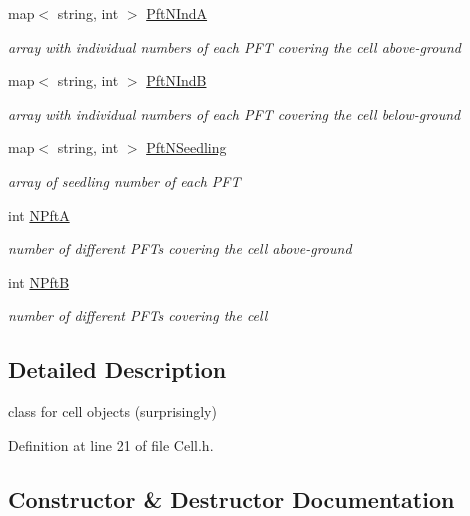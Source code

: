\begin{DoxyCompactItemize}
map$<$ string, int $>$ \mbox{\hyperlink{class_c_cell_af1774af6aa1b91f512a27782763f4948}{Pft\+N\+IndA}}
\begin{DoxyCompactList}\small\item\em array with individual numbers of each P\+FT covering the cell above-\/ground \end{DoxyCompactList}\item 
map$<$ string, int $>$ \mbox{\hyperlink{class_c_cell_a5be92efe8245f6833c68885913dab5ea}{Pft\+N\+IndB}}
\begin{DoxyCompactList}\small\item\em array with individual numbers of each P\+FT covering the cell below-\/ground \end{DoxyCompactList}\item 
\mbox{\label{class_c_cell_a7cc70952c5e55e4939d8a5adf509ec0b}} 
map$<$ string, int $>$ \mbox{\hyperlink{class_c_cell_a7cc70952c5e55e4939d8a5adf509ec0b}{Pft\+N\+Seedling}}
\begin{DoxyCompactList}\small\item\em array of seedling number of each P\+FT \end{DoxyCompactList}\item 
int \mbox{\hyperlink{class_c_cell_a26b61055f1bd6e49407af5dafeda7a41}{N\+PftA}}
\begin{DoxyCompactList}\small\item\em number of different P\+F\+Ts covering the cell above-\/ground \end{DoxyCompactList}\item 
int \mbox{\hyperlink{class_c_cell_af6d864155d2f2db766b6a4a37f42d7c1}{N\+PftB}}
\begin{DoxyCompactList}\small\item\em number of different P\+F\+Ts covering the cell \end{DoxyCompactList}\end{DoxyCompactItemize}


\subsection{Detailed Description}
class for cell objects (surprisingly) 

Definition at line 21 of file Cell.\+h.



\subsection{Constructor \& Destructor Documentation}
\mbox{\label{class_c_cell_a1de6b6c2ee4ef46f458833aba37a8018}} 
